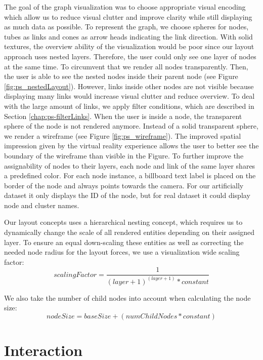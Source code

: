 The goal of the graph visualization was to choose appropriate visual encoding which allow us to reduce visual clutter and improve clarity while still displaying as much data as possible.
To represent the graph, we choose spheres for nodes, tubes as links and cones as arrow heads indicating the link direction.
With solid textures, the overview ability of the visualization would be poor since our layout approach uses nested layers. Therefore, the user could only see one layer of nodes at the same time. To circumvent that we render all nodes transparently. Then, the user is able to see the nested nodes inside their parent node (see Figure \ref{fig:ps_nestedLayout}). 
However, links inside other nodes are not visible because displaying many links would increase visual clutter and reduce overview. To deal with the large amount of links, we apply filter conditions, which are described in Section \ref{chap:ps-filterLinks}.
When the user is inside a node, the transparent sphere of the node is not rendered anymore. Instead of a solid transparent sphere, we render a wireframe (see Figure \ref{fig:ps_wireframe}). The improved spatial impression given by the virtual reality experience allows the user to better see the boundary of the wireframe than visible in the Figure. To further improve the assignability of nodes to their layers, each node and link of the same layer shares a predefined color.
For each node instance, a billboard text label is placed on the border of the node and always points towards the camera. For our artificially dataset it only displays the ID of the node, but for real dataset it could display node and cluster names.

Our layout concepts uses a hierarchical nesting concept, which requires us to dynamically change the scale of all rendered entities depending on their assigned layer. To ensure an equal down-scaling these entities as well as correcting the needed node radius for the layout forces, we use a visualization wide scaling factor:
\begin{equation}
    scalingFactor = \frac{1}{(layer+1)^{(layer+1)} * constant}
\end{equation}

\pagebreak

We also take the number of child nodes into account when calculating the node size: 
\begin{equation}
    nodeSize = baseSize + (numChildNodes * constant)
\end{equation}

\section{Interaction}
\label{chap:solution-interaction}

